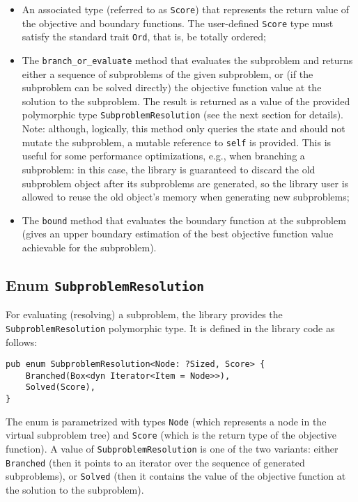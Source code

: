 \begin{itemize}
 \item An associated type (referred to as \texttt{Score}) that represents the return value of
    the objective and boundary functions. The user-defined \texttt{Score} type must satisfy
    the standard trait \texttt{Ord}, that is, be totally ordered;

 \item The \texttt{branch\_or\_evaluate} method that evaluates the subproblem and returns
    either a sequence of subproblems of the given subproblem, or (if the subproblem can be
    solved directly) the objective function value at the solution to the subproblem. The result
    is returned as a value of the provided polymorphic type \texttt{SubproblemResolution}
    (see the next section for details). \\
    Note: although, logically, this method only queries the state and should not mutate the
    subproblem, a mutable reference to \texttt{self} is provided. This is useful for some
    performance optimizations, e.g., when branching a subproblem: in this case, the library
    is guaranteed to discard the old subproblem object after its subproblems are generated,
    so the library user is allowed to reuse the old object's memory when generating new
    subproblems;

 \item The \texttt{bound} method that evaluates the boundary function at the subproblem
    (gives an upper boundary estimation of the best objective function value achievable for
    the subproblem).
\end{itemize}

\subsection{Enum \texttt{SubproblemResolution}}

\sloppy
For evaluating (resolving) a subproblem, the library provides the \texttt{SubproblemResolution}
polymorphic type. It is defined in the library code as follows:

\begin{lstlisting}[caption=Enum \texttt{SubproblemResolution}]
pub enum SubproblemResolution<Node: ?Sized, Score> {
    Branched(Box<dyn Iterator<Item = Node>>),
    Solved(Score),
}
\end{lstlisting}

The enum is parametrized with types \texttt{Node} (which represents a node in the virtual
subproblem tree) and \texttt{Score} (which is the return type of the objective function).
A value of \texttt{SubproblemResolution} is one of the two variants: either \texttt{Branched}
(then it points to an iterator over the sequence of generated subproblems), or \texttt{Solved}
(then it contains the value of the objective function at the solution to the subproblem).

